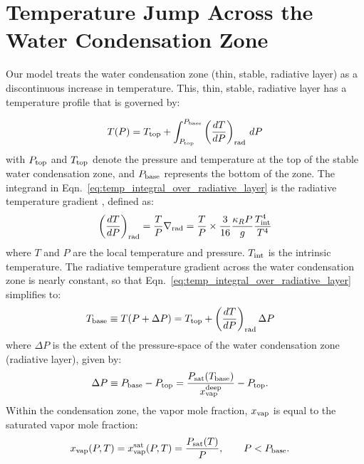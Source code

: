 \documentclass[11pt]{ucscthesisbs}
\begin{document}
\section{Temperature Jump Across the Water Condensation Zone}
Our model treats the water condensation zone (thin, stable, radiative layer) as a discontinuous increase in temperature. This, thin, stable, radiative layer has a temperature profile that is governed by:

\begin{equation}
  T(P) = T_{\rm top} + \int_{P_{\rm top}}^{P_{\rm base}} \left(\frac{dT}{dP}\right)_{\rm rad}\,d P
  \label{eq:temp_integral_over_radiative_layer}
\end{equation}
with $P_{\rm top}$ and $T_{\rm top}$ denote the pressure and temperature at the top of the stable water condensation zone, and $P_{\rm base}$ represents the bottom of the zone. The integrand in Eqn.~\ref{eq:temp_integral_over_radiative_layer} is the radiative temperature gradient \citep{leconte_2017}, defined as:
\begin{align}
  \left(\frac{dT}{dP}\right)_{\rm rad}=\frac{T}{P}\nabla_{\rm rad}
  = \frac{T}{P}\times\frac{3}{16}\frac{\kappa_R P}{g}\frac{T_{\rm int}^4}{T^4}
  \label{eq:radiative_gradient}
\end{align}
where $T$ and $P$ are the local temperature and pressure. $T_{\rm int}$ is the intrinsic temperature. The radiative temperature gradient across the water condensation zone is nearly constant, so that Eqn.~\ref{eq:temp_integral_over_radiative_layer} simplifies to:
\begin{align}
T_{\rm base}\equiv T(P+\Delta P) &= T_{\rm top} + \left(\frac{dT}{dP}\right)_{\rm rad}\Delta P
\label{eq:temperature_profile_over_radiative_layer_simplification}
\end{align}
where $\Delta P$ is the extent of the pressure-space of the water condensation zone (radiative layer), given by:
\begin{align}
\Delta P \equiv P_{\rm base}-P_{\rm top} &= \frac{P_{\rm sat}(T_{\rm base})}{x_{\rm vap}^{\rm deep}} - P_{\rm top}.
\label{eq:delta_P_over_radiative_layer}
\end{align}
Within the condensation zone, the vapor mole fraction, $x_{\rm vap}$ is equal to the saturated vapor mole fraction:
\begin{align}
x_{\rm vap}(P, T) &= x_{\rm vap}^{\rm sat}(P, T) = \frac{P_{\rm sat}(T)}{P}, \qquad P<P_{\rm base}.
\label{eq:vapor_mole_fraction_within_condensation_zone}
\end{align}
\end{document}

